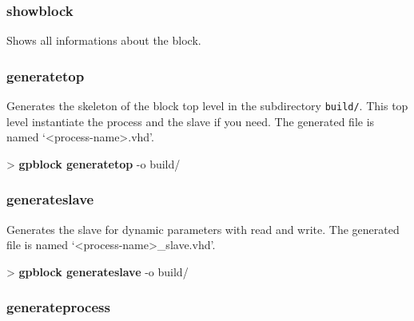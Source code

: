 \documentclass[10pt,a4paper]{article}
\begin{document}
\subsubsection{showblock}

Shows all informations about the block.

\subsubsection{generatetop}

Generates the skeleton of the block top level in the subdirectory \texttt{build/}. This top level instantiate the process and the slave if you need. The generated file is named `<process-name>.vhd'.


\begin{sampletitle}
> \textbf{gpblock generatetop} -o build/
\end{sampletitle}

\subsubsection{generateslave}

Generates the slave for dynamic parameters with read and write. The generated file is named `<process-name>\_slave.vhd'.


\begin{sampletitle}
> \textbf{gpblock generateslave} -o build/
\end{sampletitle}

\subsubsection{generateprocess}
\end{document}
